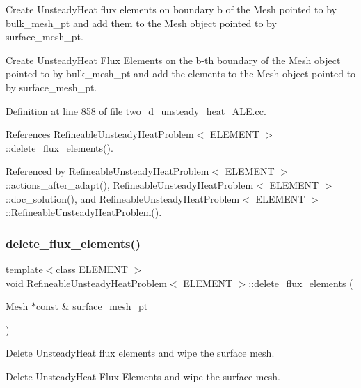 Create Unsteady\+Heat flux elements on boundary b of the Mesh pointed to by bulk\+\_\+mesh\+\_\+pt and add them to the Mesh object pointed to by surface\+\_\+mesh\+\_\+pt. 

Create Unsteady\+Heat Flux Elements on the b-\/th boundary of the Mesh object pointed to by bulk\+\_\+mesh\+\_\+pt and add the elements to the Mesh object pointed to by surface\+\_\+mesh\+\_\+pt. 

Definition at line 858 of file two\+\_\+d\+\_\+unsteady\+\_\+heat\+\_\+\+A\+L\+E.\+cc.



References Refineable\+Unsteady\+Heat\+Problem$<$ E\+L\+E\+M\+E\+N\+T $>$\+::delete\+\_\+flux\+\_\+elements().



Referenced by Refineable\+Unsteady\+Heat\+Problem$<$ E\+L\+E\+M\+E\+N\+T $>$\+::actions\+\_\+after\+\_\+adapt(), Refineable\+Unsteady\+Heat\+Problem$<$ E\+L\+E\+M\+E\+N\+T $>$\+::doc\+\_\+solution(), and Refineable\+Unsteady\+Heat\+Problem$<$ E\+L\+E\+M\+E\+N\+T $>$\+::\+Refineable\+Unsteady\+Heat\+Problem().

\mbox{\label{classRefineableUnsteadyHeatProblem_ad2e53af5c385e44e33e400b430b610e8}} 
\subsubsection{\texorpdfstring{delete\+\_\+flux\+\_\+elements()}{delete\_flux\_elements()}}
{\footnotesize\ttfamily template$<$class E\+L\+E\+M\+E\+NT $>$ \\
void \hyperlink{classRefineableUnsteadyHeatProblem}{Refineable\+Unsteady\+Heat\+Problem}$<$ E\+L\+E\+M\+E\+NT $>$\+::delete\+\_\+flux\+\_\+elements (\begin{DoxyParamCaption}\item[{Mesh $\ast$const \&}]{surface\+\_\+mesh\+\_\+pt }\end{DoxyParamCaption})}



Delete Unsteady\+Heat flux elements and wipe the surface mesh. 

Delete Unsteady\+Heat Flux Elements and wipe the surface mesh. 

